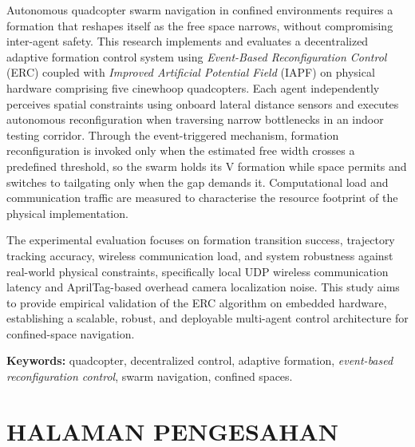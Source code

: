 \documentclass[12pt,a4paper]{report}
\begin{document}
\vspace{0.8cm}

\noindent
Autonomous quadcopter swarm navigation in confined environments requires a formation that reshapes itself as the free space narrows, without compromising inter-agent safety. This research implements and evaluates a decentralized adaptive formation control system using \textit{Event-Based Reconfiguration Control} (ERC) coupled with \textit{Improved Artificial Potential Field} (IAPF) on physical hardware comprising five cinewhoop quadcopters. Each agent independently perceives spatial constraints using onboard lateral distance sensors and executes autonomous reconfiguration when traversing narrow bottlenecks in an indoor testing corridor. Through the event-triggered mechanism, formation reconfiguration is invoked only when the estimated free width crosses a predefined threshold, so the swarm holds its V formation while space permits and switches to tailgating only when the gap demands it. Computational load and communication traffic are measured to characterise the resource footprint of the physical implementation.

\noindent
The experimental evaluation focuses on formation transition success, trajectory tracking accuracy, wireless communication load, and system robustness against real-world physical constraints, specifically local UDP wireless communication latency and AprilTag-based overhead camera localization noise. This study aims to provide empirical validation of the ERC algorithm on embedded hardware, establishing a scalable, robust, and deployable multi-agent control architecture for confined-space navigation.

\vspace{1cm}
\noindent \textbf{Keywords:} quadcopter, decentralized control, adaptive formation, \textit{event-based reconfiguration control}, swarm navigation, confined spaces.

\chapter*{HALAMAN PENGESAHAN}
\end{document}
